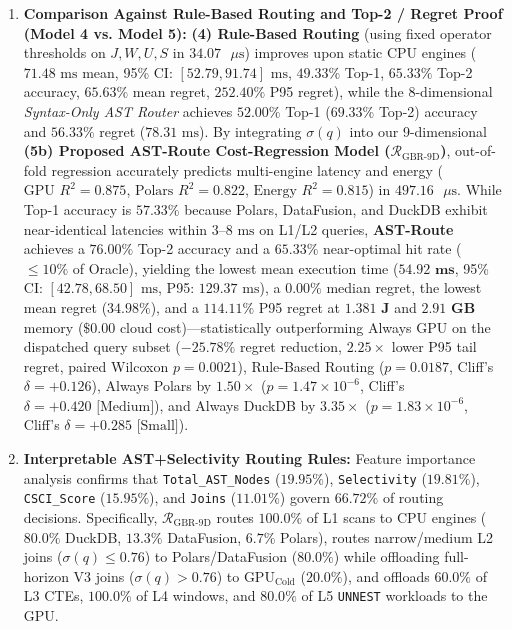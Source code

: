 \documentclass[10pt,a4paper]{article}
\begin{document}
\begin{enumerate}[leftmargin=1.5em,itemsep=2pt]
    \item \textbf{Comparison Against Rule-Based Routing and Top-2 / Regret Proof (Model 4 vs. Model 5):} \textbf{(4) Rule-Based Routing} (using fixed operator thresholds on $J, W, U, S$ in $34.07\text{ }\mu\text{s}$) improves upon static CPU engines ($71.48\text{ ms}$ mean, 95\% CI: $[52.79, 91.74]\text{ ms}$, $49.33\%$ Top-1, $65.33\%$ Top-2 accuracy, $65.63\%$ mean regret, $252.40\%$ P95 regret), while the 8-dimensional \emph{Syntax-Only AST Router} achieves $52.00\%$ Top-1 ($69.33\%$ Top-2) accuracy and $56.33\%$ regret ($78.31\text{ ms}$). By integrating $\sigma(q)$ into our 9-dimensional \textbf{(5b) Proposed AST-Route Cost-Regression Model ($\mathcal{R}_{\text{GBR-9D}}$)}, out-of-fold regression accurately predicts multi-engine latency and energy ($\text{GPU } R^2 = \mathbf{0.875}$, $\text{Polars } R^2 = \mathbf{0.822}$, $\text{Energy } R^2 = \mathbf{0.815}$) in $497.16\text{ }\mu\text{s}$. While Top-1 accuracy is $\mathbf{57.33\%}$ because Polars, DataFusion, and DuckDB exhibit near-identical latencies within $3\text{--}8\text{ ms}$ on L1/L2 queries, \textbf{AST-Route} achieves a $\mathbf{76.00\%}$ Top-2 accuracy and a $\mathbf{65.33\%}$ near-optimal hit rate ($\le 10\%$ of Oracle), yielding the lowest mean execution time ($\mathbf{54.92\text{ ms}}$, 95\% CI: $[42.78, 68.50]\text{ ms}$, P95: $129.37\text{ ms}$), a $\mathbf{0.00\%}$ median regret, the lowest mean regret ($\mathbf{34.98\%}$), and a $\mathbf{114.11\%}$ P95 regret at $\mathbf{1.381\text{ J}}$ and $\mathbf{2.91\text{ GB}}$ memory ($\mathbf{\$0.00}$ cloud cost)---statistically outperforming Always GPU on the dispatched query subset ($-25.78\%$ regret reduction, $2.25\times$ lower P95 tail regret, paired Wilcoxon $p = \mathbf{0.0021}$), Rule-Based Routing ($p = 0.0187$, Cliff's $\delta = +0.126$), Always Polars by $\mathbf{1.50\times}$ ($p = 1.47 \times 10^{-6}$, Cliff's $\delta = +0.420\text{ [Medium]}$), and Always DuckDB by $\mathbf{3.35\times}$ ($p = 1.83 \times 10^{-6}$, Cliff's $\delta = +0.285\text{ [Small]}$).
    \item \textbf{Interpretable AST+Selectivity Routing Rules:} Feature importance analysis confirms that \texttt{Total\_AST\_Nodes} ($\mathbf{19.95\%}$), \texttt{Selectivity} ($\mathbf{19.81\%}$), \texttt{CSCI\_Score} ($\mathbf{15.95\%}$), and \texttt{Joins} ($\mathbf{11.01\%}$) govern $66.72\%$ of routing decisions. Specifically, $\mathcal{R}_{\text{GBR-9D}}$ routes $100.0\%$ of L1 scans to CPU engines ($80.0\%$ DuckDB, $13.3\%$ DataFusion, $6.7\%$ Polars), routes narrow/medium L2 joins ($\sigma(q) \le 0.76$) to Polars/DataFusion ($80.0\%$) while offloading full-horizon V3 joins ($\sigma(q) > 0.76$) to $\text{GPU}_{\text{Cold}}$ ($20.0\%$), and offloads $60.0\%$ of L3 CTEs, $100.0\%$ of L4 windows, and $80.0\%$ of L5 \texttt{UNNEST} workloads to the GPU.
\end{enumerate}
\end{document}
